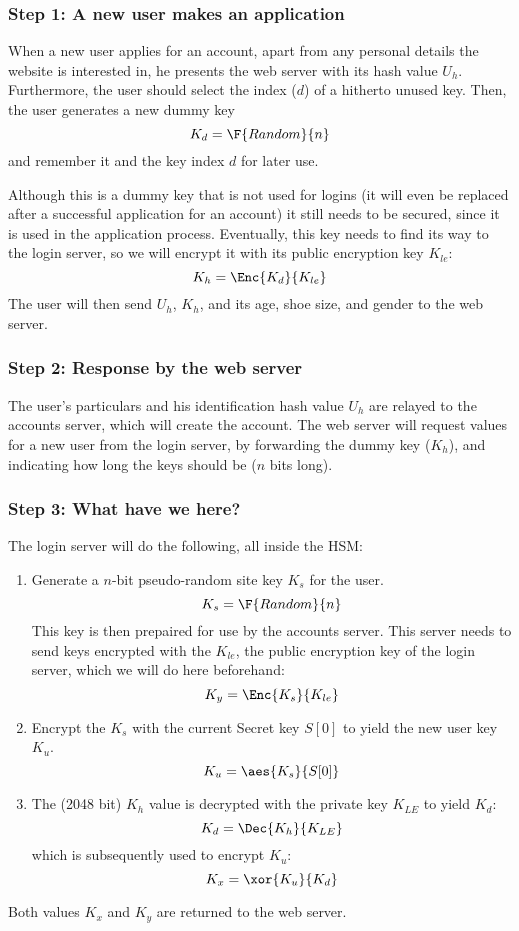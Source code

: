 \label{sec:applying}
\subsubsection{Step 1: A new user makes an application}
\label{sec:apply_step1}
When a new user applies for an account,
apart from any personal details the website is interested in,
he presents the web server with its hash value $U_h$.
Furthermore,
the user should select the index ($d$) of a hitherto unused key.
Then, the user generates a new dummy key
\[K_d=\F{Random}{n}\]
and remember it and the key index $d$ for later use.
\par
Although this is a dummy key that is not used for logins
(it will even be replaced after a successful application for an account)
it still needs to be secured,
since it is used in the application process.
Eventually,
this key needs to find its way to the login server,
so we will encrypt it with its public encryption key $K_{le}$:
\[K_h=\Enc{K_d}{K_{le}}\]
The user will then send $U_h$, $K_h$, and its age, shoe size, and gender to the web server.

\subsubsection{Step 2: Response by the web server}
\label{sec:apply_step2}
The user's particulars and his identification hash value $U_h$ are relayed to the accounts server,
which will create the account.
The web server will request values for a new user from the login server,
by forwarding the dummy key ($K_h$),
and indicating how long the keys should be
($n$ bits long).

\subsubsection{Step 3: What have we here?}
\label{sec:apply_step3}
The login server will do the following, all inside the HSM:
\begin{enumerate}
\item Generate a $n$-bit pseudo-random site key $K_s$ for the user.
\[K_s=\F{Random}{n}\]
This key is then prepaired for use by the accounts server.
This server needs to send keys encrypted with the $K_{le}$, the public encryption key of the login server,
which we will do here beforehand:
\[K_y=\Enc{K_s}{K_{le}}\]
\item Encrypt the $K_s$ with the current Secret key $S[0]$ to yield the new user key $K_u$.
\[K_u=\aes{K_s}{S[0]}\]
\item The (2048 bit) $K_h$ value is decrypted with the private key $K_{LE}$ to yield $K_d$:
\[K_d=\Dec{K_h}{K_{LE}}\]
which is subsequently used to encrypt $K_u$:
\[K_x=\xor{K_u}{K_d}\]
\end{enumerate}
Both values $K_x$ and $K_y$ are returned to the web server.
